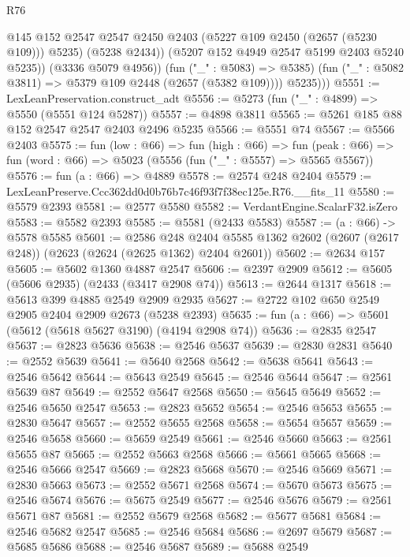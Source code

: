 \begin{lexlean}{R76}
\begin{coremodule}
                    @145
                    @152
                    @2547
                    @2547
                    @2450
                    @2403
                    (@5227 @109 @2450 (@2657 (@5230 @109)))
                    @5235)
                  (@5238 @2434))
                (@5207 @152 @4949 @2547 @5199 @2403 @5240 @5235))
              (@3336 @5079 @4956))
            (fun ("_" : @5083) => @5385)
            (fun ("_" : @5082 @3811) => @5379 @109 @2448 (@2657 (@5382 @109))))
          @5235)))
@5551 := LexLeanPreservation.construct_adt
@5556 := @5273 (fun ("_" : @4899) => @5550 (@5551 @124 @5287))
@5557 := @4898 @3811
@5565 := @5261 @185 @88 @152 @2547 @2547 @2403 @2496 @5235
@5566 := @5551 @74
@5567 := @5566 @2403
@5575 := fun (low : @66) =>
  fun (high : @66) =>
  fun (peak : @66) => fun (word : @66) => @5023 (@5556 (fun ("_" : @5557) => @5565 @5567))
@5576 := fun (a : @66) => @4889
@5578 := @2574 @248 @2404
@5579 := LexLeanPreserve.Ccc362dd0d0b76b7c46f93f7f38ec125e.R76.__fits_11
@5580 := @5579 @2393
@5581 := @2577 @5580
@5582 := VerdantEngine.ScalarF32.isZero
@5583 := @5582 @2393
@5585 := @5581 (@2433 @5583)
@5587 := (a : @66) -> @5578 @5585
@5601 := @2586
    @248
    @2404
    @5585
    @1362
    @2602
    (@2607 (@2617 @248))
    (@2623 (@2624 (@2625 @1362) @2404 @2601))
@5602 := @2634 @157
@5605 := @5602 @1360 @4887 @2547
@5606 := @2397 @2909
@5612 := @5605 (@5606 @2935) (@2433 (@3417 @2908 @74))
@5613 := @2644 @1317
@5618 := @5613 @399 @4885 @2549 @2909 @2935
@5627 := @2722 @102 @650 @2549 @2905 @2404 @2909 @2673 (@5238 @2393)
@5635 := fun (a : @66) => @5601 (@5612 (@5618 @5627 @3190) (@4194 @2908 @74))
@5636 := @2835 @2547
@5637 := @2823 @5636
@5638 := @2546 @5637
@5639 := @2830 @2831
@5640 := @2552 @5639
@5641 := @5640 @2568
@5642 := @5638 @5641
@5643 := @2546 @5642
@5644 := @5643 @2549
@5645 := @2546 @5644
@5647 := @2561 @5639 @87
@5649 := @2552 @5647 @2568
@5650 := @5645 @5649
@5652 := @2546 @5650 @2547
@5653 := @2823 @5652
@5654 := @2546 @5653
@5655 := @2830 @5647
@5657 := @2552 @5655 @2568
@5658 := @5654 @5657
@5659 := @2546 @5658
@5660 := @5659 @2549
@5661 := @2546 @5660
@5663 := @2561 @5655 @87
@5665 := @2552 @5663 @2568
@5666 := @5661 @5665
@5668 := @2546 @5666 @2547
@5669 := @2823 @5668
@5670 := @2546 @5669
@5671 := @2830 @5663
@5673 := @2552 @5671 @2568
@5674 := @5670 @5673
@5675 := @2546 @5674
@5676 := @5675 @2549
@5677 := @2546 @5676
@5679 := @2561 @5671 @87
@5681 := @2552 @5679 @2568
@5682 := @5677 @5681
@5684 := @2546 @5682 @2547
@5685 := @2546 @5684
@5686 := @2697 @5679
@5687 := @5685 @5686
@5688 := @2546 @5687
@5689 := @5688 @2549

\end{coremodule}
\end{lexlean}
